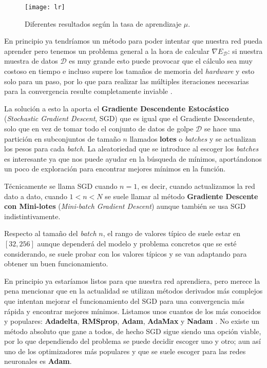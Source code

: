\begin{figure}[htpb]
  \centering
  \texttt{[image: lr]}
  \caption{Diferentes resultados según la tasa de aprendizaje $\mu$.}
  \label{fig:lr}
\end{figure}

En principio ya tendríamos un método para poder intentar que nuestra red pueda aprender pero tenemos un problema general a la hora de calcular $\nabla E_\mathcal{D}$: si nuestra muestra de datos $\mathcal{D}$ es muy grande esto puede provocar que el cálculo sea muy costoso en tiempo e incluso supere los tamaños de memoria del \emph{hardware} y esto solo para un paso, por lo que para realizar las múltiples iteraciones necesarias para la convergencia resulte completamente inviable \cite{ruder2016overview}.

La solución a esto la aporta el \textbf{Gradiente Descendente Estocástico} (\emph{Stochastic Gradient Descent}, SGD) \cite{robbins1951stochastic} que es igual que el Gradiente Descendente, solo que en vez de tomar todo el conjunto de datos de golpe $\mathcal{D}$ se hace una partición en subconjuntos de tamaño $n$ llamados \textbf{lotes} o \emph{batches} y se actualizan los pesos para cada \emph{batch}. La aleatoriedad que se introduce al escoger los \emph{batches} es interesante ya que nos puede ayudar en la búsqueda de mínimos, aportándonos un poco de exploración para encontrar mejores mínimos en la función.

Técnicamente se llama SGD cuando $n=1$, es decir, cuando actualizamos la red dato a dato, cuando $1 < n < N$ se suele llamar al método \textbf{Gradiente Descente con Mini-lotes} (\emph{Mini-batch Gradient Descent}) aunque también se usa SGD indistintivamente.

Respecto al tamaño del \emph{batch} $n$, el rango de valores típico de suele estar en $[32, 256]$ aunque dependerá del modelo y problema concretos que se esté considerando, se suele probar con los valores típicos y se van adaptando para obtener un buen funcionamiento.

En principio ya estaríamos listos para que nuestra red aprendiera, pero merece la pena mencionar que en la actualidad se utilizan métodos derivados más complejos que intentan mejorar el funcionamiento del SGD para una convergencia más rápida y encontrar mejores mínimos. Listamos unos cuantos de los más conocidos y populares: \textbf{Adadelta}, \textbf{RMSprop}, \textbf{Adam}, \textbf{AdaMax} y \textbf{Nadam} \cite{ruder2016overview}. No existe un método absoluto que gane a todos, de hecho SGD sigue siendo una opción viable, por lo que dependiendo del problema se puede decidir escoger uno y otro; aun así uno de los optimizadores más populares y que se suele escoger para las redes neuronales es \textbf{Adam}.


